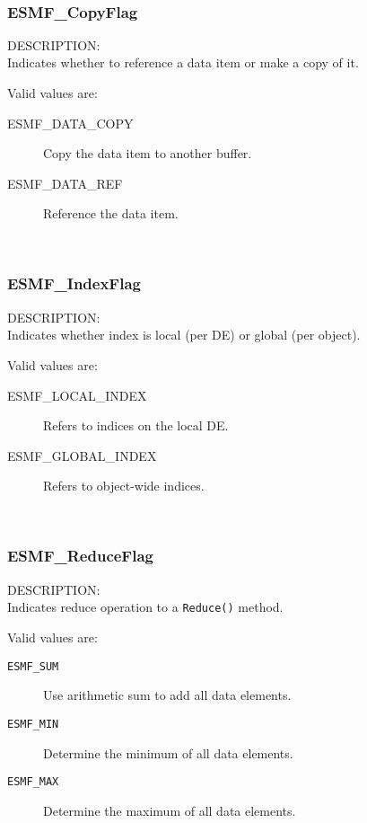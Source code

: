 \mbox{}\hrulefill\

\subsubsection{ESMF\_CopyFlag}

{\sf DESCRIPTION:\\}
Indicates whether to reference a data item or make a copy of it.

Valid values are:
\begin{description}
\item [ESMF\_DATA\_COPY]
      Copy the data item to another buffer.
\item [ESMF\_DATA\_REF]
      Reference the data item.
\end{description}

\mbox{}\hrulefill\

\subsubsection{ESMF\_IndexFlag}

{\sf DESCRIPTION:\\}
Indicates whether index is local (per DE) or global (per object).

Valid values are:
\begin{description}
\item [ESMF\_LOCAL\_INDEX]
      Refers to indices on the local DE.
\item [ESMF\_GLOBAL\_INDEX]
      Refers to object-wide indices.
\end{description}

\mbox{}\hrulefill\

\subsubsection{ESMF\_ReduceFlag}

{\sf DESCRIPTION:\\}
Indicates reduce operation to a {\tt Reduce()} method.

Valid values are:
\begin{description}
   \item [{\tt ESMF\_SUM}]
         Use arithmetic sum to add all data elements.
   \item [{\tt ESMF\_MIN}]
         Determine the minimum of all data elements.
   \item [{\tt ESMF\_MAX}]
         Determine the maximum of all data elements.
\end{description}

